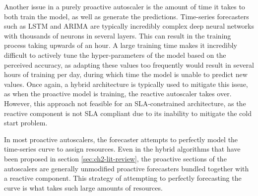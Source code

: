 
Another issue in a purely proactive autoscaler is the amount of time it takes to both train the model, as well as generate the predictions. Time-series forecasters such as LSTM and ARIMA are typically incredibly complex deep neural networks with thousands of neurons in several layers. This can result in the training process taking upwards of an hour. A large training time makes it incredibly difficult to actively tune the hyper-parameters of the model based on the perceived accuracy, as adapting these values too frequently would result in several hours of training per day, during which time the model is unable to predict new values. Once again, a hybrid architecture is typically used to mitigate this issue, as when the proactive model is training, the reactive autoscaler takes over. However, this approach not feasible for an SLA-constrained architecture, as the reactive component is not SLA compliant due to its inability to mitigate the cold start problem.\par

In most proactive autoscalers, the forecaster attempts to perfectly model the time-series curve to assign resources. Even in the hybrid algorithms that have been proposed in section \ref{sec:ch2-lit-review}, the proactive sections of the autoscalers are generally unmodified proactive forecasters bundled together with a reactive component. This strategy of attempting to perfectly forecasting the curve is what takes such large amounts of resources.\par

